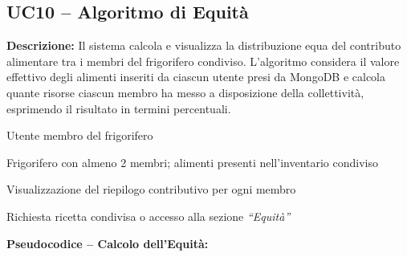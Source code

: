 \documentclass[12pt,a4paper,twoside]{report}
\newenvironment{ucbox}{%
  \begin{mdframed}[
    backgroundcolor=ucbg,
    linecolor=ucborder,
    linewidth=1pt,
    innerleftmargin=10pt,
    innerrightmargin=10pt,
    innertopmargin=8pt,
    innerbottommargin=8pt,
    roundcorner=4pt
  ]
}{%
  \end{mdframed}
}
\begin{document}
\newpage
\subsection{UC10 -- Algoritmo di Equità}

\begin{ucbox}
\textbf{Descrizione:} Il sistema calcola e visualizza la distribuzione equa del contributo alimentare tra i membri del frigorifero condiviso. L'algoritmo considera il valore effettivo degli alimenti inseriti da ciascun utente presi da MongoDB e calcola quante risorse ciascun membro ha messo a disposizione della collettività, esprimendo il risultato in termini percentuali.

\begin{description}[leftmargin=4cm, style=sameline]
  \item[Attori Coinvolti:] Utente membro del frigorifero
  \item[Precondizione:] Frigorifero con almeno 2 membri; alimenti presenti nell'inventario condiviso
  \item[Postcondizione:] Visualizzazione del riepilogo contributivo per ogni membro
  \item[Trigger:] Richiesta ricetta condivisa o accesso alla sezione \textit{``Equità''}
\end{description}
\end{ucbox}

\textbf{Pseudocodice -- Calcolo dell'Equità:}
\end{document}
